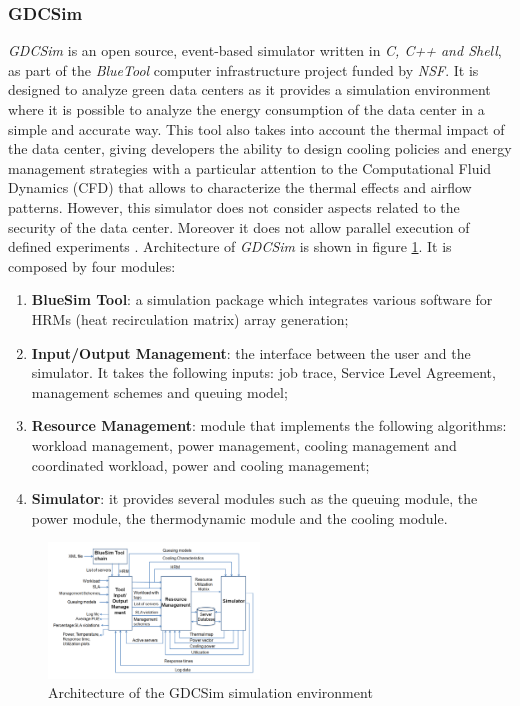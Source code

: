 {\subsubsection*{GDCSim}
\emph{GDCSim} \cite{gupta2011gdcsim} is an open source, event-based simulator written in \emph{C, C++ and Shell}, as part of the \emph{BlueTool} computer infrastructure project funded by \emph{NSF}. It is designed to analyze green data centers as it provides a simulation environment where it is possible to analyze the energy consumption of the data center in a simple and accurate way. This tool also takes into account the thermal impact of the data center, giving developers the ability to design cooling policies and energy management strategies with a particular attention to the Computational Fluid Dynamics (CFD) that allows to characterize the thermal effects and airflow patterns. However, this simulator does not consider aspects related to the security of the data center. Moreover it does not allow parallel execution of defined experiments \cite{mansouri2020cloud}.
Architecture of \emph{GDCSim} is shown in figure \ref{fig:gdcsim_arch}. It is composed by four modules:
\begin{enumerate}
    \item \textbf{BlueSim Tool}: a simulation package which integrates various software for HRMs (heat recirculation matrix) array generation;
    \item \textbf{Input/Output Management}: the interface between the user and the simulator. It takes the following inputs: job trace, Service Level Agreement, management schemes and queuing model;
    \item \textbf{Resource Management}: module that implements the following algorithms: workload management, power management, cooling management and coordinated workload, power and cooling management;
    \item \textbf{Simulator}: it provides several modules such as the queuing module, the power module, the thermodynamic module and the cooling module.
\end{enumerate}
\begin{figure}[h]
    \centering
    \includegraphics[width=0.5\textwidth]{chapters/images/gdcsim_arch.png}
    \caption{Architecture of the GDCSim simulation environment}
    \label{fig:gdcsim_arch}
\end{figure}

}
